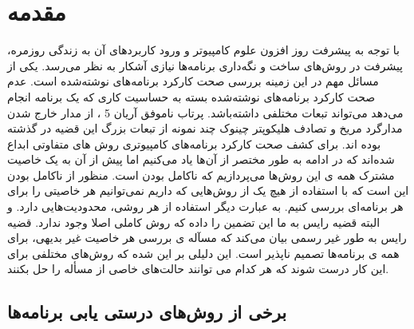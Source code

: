 \pagestyle{plain}
\setcounter{page}{1}

\chapter{مقدمه}


با توجه به پیشرفت روز‌ افزون علوم کامپیوتر و ورود کاربرد‌های آن به زندگی روزمره، پیشرفت در روش‌های ساخت و نگه‌داری برنامه‌ها نیازی آشکار به نظر می‌رسد. یکی از مسائل مهم در این زمینه بررسی صحت کارکرد برنامه‌های نوشته‌شده است. عدم صحت کارکرد برنامه‌های نوشته‌شده بسته به حساسیت کاری که یک برنامه انجام می‌دهد می‌تواند تبعات مختلفی داشته‌باشد. پرتاب ناموفق آریان 5\cite{ariane}  ، از مدار خارج شدن مدار‌گرد مریخ \cite{orbiter} و  تصادف هلیکوپتر چینوک \cite{chinook} چند نمونه از تبعات بزرگ این قضیه در گذشته بوده اند.
برای کشف صحت کارکرد برنامه‌های کامپیوتری روش های متفاوتی ابداع شده‌اند که در ادامه به طور مختصر از آن‌ها یاد می‌کنیم اما پیش از آن به یک خاصیت مشترک همه ی این روش‌ها می‌پردازیم که ناکامل بودن است. منظور از ناکامل بودن این است که با استفاده از هیچ یک از روش‌هایی که داریم نمی‌توانیم هر خاصیتی را برای هر برنامه‌ای بررسی کنیم. به عبارت دیگر استفاده از هر روشی، محدودیت‌هایی دارد. و البته قضیه رایس  \cite{rice} به ما این تضمین را داده که روش کاملی اصلا وجود ندارد. قضیه رایس به طور غیر رسمی بیان می‌کند که مسآله ی بررسی هر خاصیت غیر بدیهی، برای همه ی برنامه‌ها تصمیم ناپذیر است. این دلیلی بر این شده که روش‌های مختلفی برای این کار درست شوند که هر کدام می توانند حالت‌های خاصی از مسأله را حل بکنند.



\section{برخی از روش‌های درستی یابی برنامه‌ها‬}

